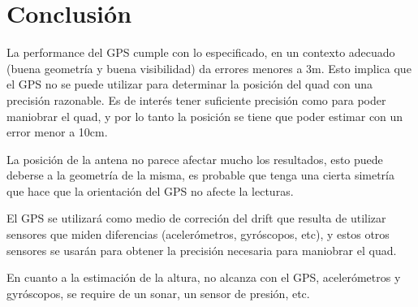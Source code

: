 \documentclass[spanish,12pt,a4paper,titlepage]{report}
\begin{document}

\newpage
\section{Conclusión}
\label{sec:conclusion}

La performance del GPS cumple con lo especificado, en un contexto adecuado (buena geometría y buena visibilidad) da errores menores a 3m. Esto implica que el GPS no se puede utilizar para determinar la posición del quad con una precisión razonable. Es de interés tener suficiente precisión como para poder maniobrar el quad, y por lo tanto la posición se tiene que poder estimar con un error menor a 10cm.

La posición de la antena no parece afectar mucho los resultados, esto puede deberse a la geometría de la misma, es probable que tenga una cierta simetría que hace que la orientación del GPS no afecte la lecturas.

El GPS se utilizará como medio de correción del drift que resulta de utilizar sensores que miden diferencias (acelerómetros, gyróscopos, etc), y estos otros sensores se usarán para obtener la precisión necesaria para maniobrar el quad.

En cuanto a la estimación de la altura, no alcanza con el GPS, acelerómetros y gyróscopos, se require de un sonar, un sensor de presión, etc.
\end{document}
